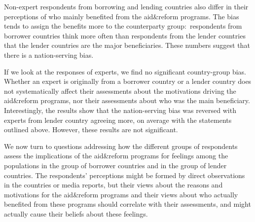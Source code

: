 Non-expert respondents from borrowing and lending countries also differ in
their perceptions of who mainly benefited from the aid\&reform programs. The
bias tends to assign the benefits more to the counterparty group:\
respondents from borrower countries think more often than respondents from
the lender countries that the lender countries are the major beneficiaries. These numbers
suggest that there is a nation-serving bias. 

If we look at the responses of experts, we find no significant country-group
bias. Whether an expert is originally from a borrower country or a lender
country does not systematically affect their assessments about the
motivations driving the aid\&reform programs, nor their assessments about
who was the main beneficiary. Interestingly, the results show that the
nation-serving bias was reversed with experts from lender country agreeing more, on
average with the statements outlined above. However, these results are not significant.

We now turn to questions addressing how the different groups of respondents
assess the implications of the aid\&reform programs for feelings among the
populations in the group of borrower countries and in the group of lender
countries. The respondents' perceptions might be formed by direct
observations in the countries or media reports, but their views about the
reasons and motivations for the aid\&reform programs and their views about
who actually benefited from these programs should correlate with their
assessments, and might actually cause their beliefs about these feelings. 

